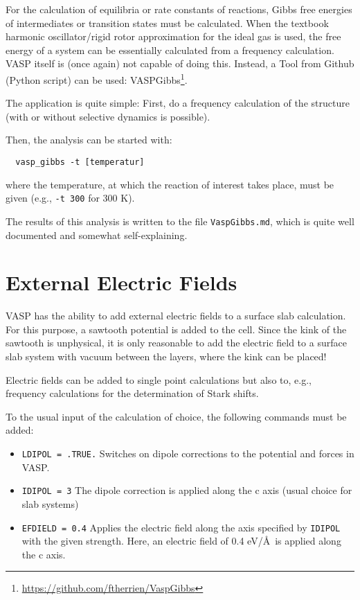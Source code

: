 \documentclass[a4paper,11pt]{article}
\begin{document}
 For the calculation of equilibria or rate constants of reactions, Gibbs free energies
 of intermediates or transition states must be calculated.
 When the textbook harmonic oscillator/rigid rotor approximation for the ideal gas
 is used, the free energy of a system can be essentially calculated from a
 frequency calculation.
 VASP itself is (once again) not capable of doing this.
 Instead, a Tool from Github (Python script) can be used:
 VASPGibbs\footnote{\url{https://github.com/ftherrien/VaspGibbs}}.

 The application is quite simple: First, do a frequency calculation of the
 structure (with or without selective dynamics is possible).

 Then, the analysis can be started with:

 \begin{verbatim}
  vasp_gibbs -t [temperatur]
 \end{verbatim}

 where the temperature, at which the reaction of interest takes place, must be given
 (e.g., \texttt{-t 300} for 300 K).

 The results of this analysis is written to the file \texttt{VaspGibbs.md}, which
 is quite well documented and somewhat self-explaining.

\section{External Electric Fields}

VASP has the ability to add external electric fields to a surface slab calculation.
For this purpose, a sawtooth potential is added to the cell. Since the kink
of the sawtooth is unphysical, it is only reasonable to add the electric field
to a surface slab system with vacuum between the layers, where the kink can be placed!

Electric fields can be added to single point calculations but also to, e.g., frequency
calculations for the determination of Stark shifts.

To the usual input of the calculation of choice, the following commands must be added:

\begin{itemize}
 \item \texttt{LDIPOL = .TRUE.} Switches on dipole corrections to the potential and forces in VASP.
 \item \texttt{IDIPOL = 3} The dipole correction is applied along the c axis (usual choice for slab systems)
 \item \texttt{EFDIELD = 0.4} Applies the electric field along the axis specified by \texttt{IDIPOL} with the given strength. Here, an electric field of 0.4 eV/\AA~is applied along the c axis.
\end{itemize}
\end{document}
